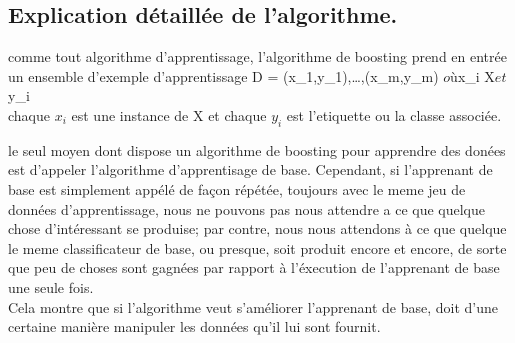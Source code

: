 \documentclass[french,a4paper,12pt]{article}
\begin{document}
\begin{algorithm}
\begin{algorithmic}


    
    
\end{algorithmic}
\end{algorithm}

\subsection{Explication détaillée de l'algorithme.}\citep{schapire}



\quad comme tout algorithme d'apprentissage, l'algorithme de boosting prend en entrée un ensemble d'exemple d'apprentissage  D = {(x_1,y_1),\ldots,(x_m,y_m)} $ où $x_i \in X$ et  $y_i  \in [{-1,+1}]\\



\quad chaque $x_i$ est une instance de X  et chaque $y_i$ est l'etiquette ou la classe  associée. 




\quad le seul moyen dont dispose un algorithme de boosting pour apprendre des donées est d'appeler l'algorithme d'apprentisage de base. Cependant, si l'apprenant de base est simplement appélé de façon répétée, toujours avec le meme jeu de données d'apprentissage, nous ne pouvons pas nous attendre a ce que quelque chose d'intéressant se produise; par contre, nous nous attendons à ce que quelque le meme classificateur de base, ou presque, soit produit encore et encore, de sorte que peu de choses sont gagnées par rapport à l'éxecution de l'apprenant de base une seule fois.\\ 


\quad Cela montre que si l'algorithme veut s'améliorer l'apprenant de base, doit d'une certaine manière manipuler les données qu'il lui sont fournit.\\
\end{document}
